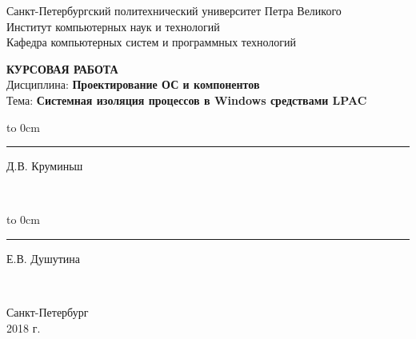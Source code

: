 	\begin{titlepage}
		\begin{center}
			\large {Санкт-Петербургский политехнический университет Петра Великого\\
				Институт компьютерных наук и технологий}\\
				Кафедра компьютерных систем и программных технологий
		\end{center}

		\vfill
		\begin{center}
			\large{\textbf{КУРСОВАЯ РАБОТА} \\ \vspace*{2cm}
			Дисциплина: \textbf{Проектирование ОС и компонентов}\\
			Тема: \textbf{Системная изоляция процессов в Windows средствами LPAC}}
		\end{center}
		
		\vfill
		
		\hfill\parbox{9 cm}{\hspace*{3cm}\hbox to 0cm{\raisebox{-1em}{\small(подпись)}}\hspace*{-0.8cm}\rule{3cm}{0.8pt} Д.В. Круминьш}\\[0.6cm]
		
		 \hfill\parbox{9 cm}{\hspace*{3cm}\hbox to 0cm{\raisebox{-1em}{\small(подпись)}}\hspace*{-0.8cm}\rule{3cm}{0.8pt} Е.В. Душутина}\\[0.6cm]
		
		\vspace{\fill}
		\begin{center}
			Санкт-Петербург \\ 2018 г.
		\end{center}
	\end{titlepage}
\setcounter{page}{3}
